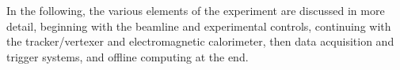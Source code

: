 
In the following, the various elements of the experiment are discussed in more detail, beginning with the beamline and experimental controls, continuing with the tracker/vertexer and electromagnetic calorimeter, then data acquisition and trigger systems, and offline computing at the end. 
 
 

